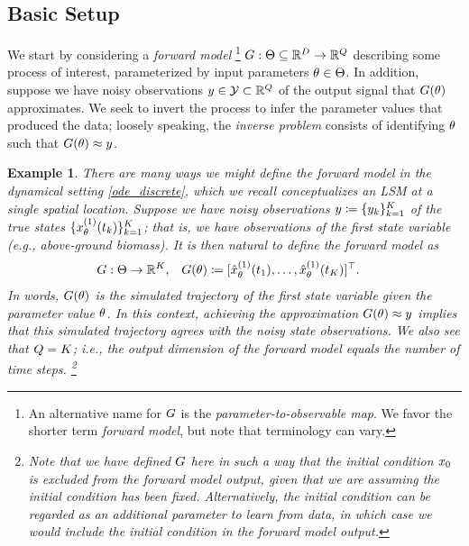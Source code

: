 \documentclass[12pt]{article}
\newtheorem{example}{Example}
\begin{document}
\subsection{Basic Setup}
We start by considering a \textit{forward model} 
\footnote{An alternative name for $\fwd$ is the \textit{parameter-to-observable map}. We favor the shorter term 
\textit{forward model}, but note that terminology can vary.}
$\fwd: \parSpace \subseteq \R^{\dimPar} \to \R^{\dimObs}$ describing some 
process of interest, parameterized by input parameters $\Par \in \parSpace$. In addition, suppose we have noisy 
observations $\obs \in \obsSpace \subset \R^{\dimObs}$ of the output signal that $\fwd(\Par)$ approximates. 
We seek to invert the process to infer the parameter values that produced the data; loosely speaking, the 
\textit{inverse problem} consists of identifying $\Par$ such that $\fwd(\Par) \approx \obs$. 

\begin{example} \label{ex:lsm-state-obs}
There are many ways we might define the forward model in the dynamical setting \ref{ode_discrete}, which we recall 
conceptualizes an LSM at a single spatial location. Suppose we have noisy observations 
$\obs \Def \{\indexTime{\obs}\}_{\timeIdx=\firstTimeIdxObs}^{\lastTimeIdx}$ 
of the true states $\{\indexState[1]{\state}_{\Par}(\indexTime{\Time})\}_{\timeIdx=\firstTimeIdxObs}^{\lastTimeIdx}$; that is, we have observations of 
the first state variable (e.g., above-ground biomass). It is then natural to define the forward model as 
\begin{align}
&\fwd: \parSpace \to \R^{\Ntime}, && \fwd(\Par) 
\Def [\indexState[1]{\stateApprox}_{\Par}(\indexTime[\firstTimeIdxObs]{\Time}), \dots, \indexState[1]{\stateApprox}_{\Par}(\indexTime[\lastTimeIdx]{\Time})]^\top. \label{fwd_model}
\end{align}
In words, $\fwd(\Par)$ is the simulated trajectory of the first state variable given the parameter value $\Par$. In this context, achieving 
the approximation $\fwd(\Par) \approx \obs$ implies that this simulated trajectory agrees with the noisy state observations. We also 
see that $\dimObs = \Ntime$; i.e., the output dimension of the forward model equals the number of time steps.
\footnote{Note that we have defined $\fwd$ here in such a way that the initial condition $\stateInit$ is excluded from the forward model 
output, given that we are assuming the initial condition has been fixed. Alternatively, the initial condition can be regarded as an additional 
parameter to learn from data, in which case we would include the initial condition in the forward model output.} 
\end{example}
\end{document}
